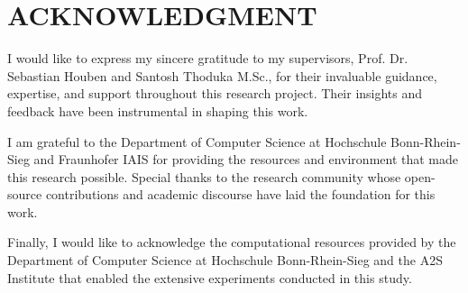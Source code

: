 \documentclass[../ShajiS_RnDReport.tex]{subfiles}
\begin{document}
    \section*{ACKNOWLEDGMENT}

    I would like to express my sincere gratitude to my supervisors, Prof. Dr. Sebastian Houben and Santosh Thoduka M.Sc., for their invaluable guidance, expertise, and support throughout this research project. Their insights and feedback have been instrumental in shaping this work.

    I am grateful to the Department of Computer Science at Hochschule Bonn-Rhein-Sieg and Fraunhofer IAIS for providing the resources and environment that made this research possible. Special thanks to the research community whose open-source contributions and academic discourse have laid the foundation for this work.

    Finally, I would like to acknowledge the computational resources provided by the Department of Computer Science at Hochschule Bonn-Rhein-Sieg and the A2S Institute that enabled the extensive experiments conducted in this study.
\end{document}
